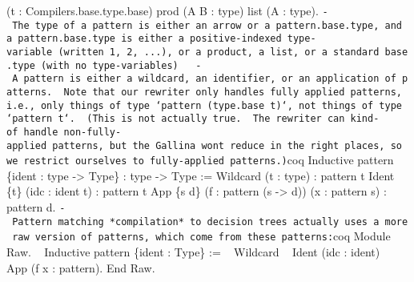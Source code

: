 (t : Compilers.base.type.base) \textbar{} prod (A B : type) \textbar{}
list (A : type).
\texttt{-\ The\ type\ of\ a\ pattern\ is\ either\ an\ arrow\ or\ a\ pattern.base.type,\ and\ a\ pattern.base.type\ is\ either\ a\ positive-indexed\ type-variable\ (written\ \textquotesingle{}1,\ \textquotesingle{}2,\ ...),\ or\ a\ product,\ a\ list,\ or\ a\ standard\ base.type\ (with\ no\ type-variables)\ \ \ -\ A\ pattern\ is\ either\ a\ wildcard,\ an\ identifier,\ or\ an\ application\ of\ patterns.\ \ Note\ that\ our\ rewriter\ only\ handles\ fully\ applied\ patterns,\ i.e.,\ only\ things\ of\ type\ `pattern\ (type.base\ t)`,\ not\ things\ of\ type\ `pattern\ t`.\ \ (This\ is\ not\ actually\ true.\ \ The\ rewriter\ can\ kind-of\ handle\ non-fully-applied\ patterns,\ but\ the\ Gallina\ won\textquotesingle{}t\ reduce\ in\ the\ right\ places,\ so\ we\ restrict\ ourselves\ to\ fully-applied\ patterns.)}coq
Inductive pattern \{ident : type -\textgreater{} Type\} : type
-\textgreater{} Type := \textbar{} Wildcard (t : type) : pattern t
\textbar{} Ident \{t\} (idc : ident t) : pattern t \textbar{} App \{s
d\} (f : pattern (s -\textgreater{} d)) (x : pattern s) : pattern d.
\texttt{-\ Pattern\ matching\ *compilation*\ to\ decision\ trees\ actually\ uses\ a\ more\ raw\ version\ of\ patterns,\ which\ come\ from\ these\ patterns:}coq
Module Raw. ~ Inductive pattern \{ident : Type\} := ~ \textbar{}
Wildcard ~ \textbar{} Ident (idc : ident) ~ \textbar{} App (f x :
pattern). End Raw.
